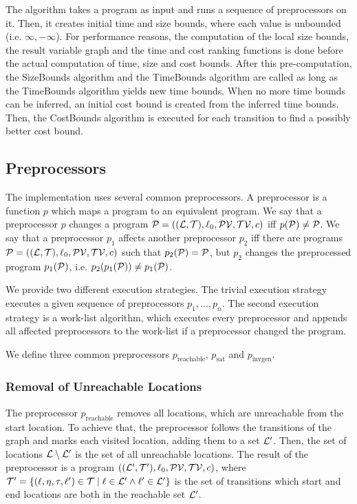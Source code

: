The algorithm takes a program as input and runs a sequence of preprocessors on it.
Then, it creates initial time and size bounds, where each value is unbounded (i.e. $\infty, -\infty$).
For performance reasons, the computation of the local size bounds, the result variable graph and the time and cost ranking functions is done before the actual computation of time, size and cost bounds.
After this pre-computation, the SizeBounds algorithm and the TimeBounds algorithm are called as long as the TimeBounds algorithm yields new time bounds.
When no more time bounds can be inferred, an initial cost bound is created from the inferred time bounds.
Then, the CostBounds algorithm is executed for each transition to find a possibly better cost bound.

\subsection{Preprocessors}

The implementation uses several common preprocessors.
A preprocessor is a function $p$ which maps a program to an equivalent program.
We say that a preprocessor $p$ changes a program $\mathcal{P} = ((\mathcal{L}, \mathcal{T}), \ell_0, \mathcal{PV}, \mathcal{TV}, c)$ iff $p(\mathcal{P}) \neq \mathcal{P}$.
We say that a preprocessor $p_1$ affects another preprocessor $p_2$ iff there are programs $\mathcal{P} = ((\mathcal{L}, \mathcal{T}), \ell_0, \mathcal{PV}, \mathcal{TV}, c)$ such that $p_2(\mathcal{P}) = \mathcal{P}$, but $p_2$ changes the preprocessed program $p_1(\mathcal{P})$, i.e. $p_2(p_1(\mathcal{P})) \neq p_1(\mathcal{P})$.

We provide two different execution strategies.
The trivial execution strategy executes a given sequence of preprocessors $p_1, \dots, p_n$.
The second execution strategy is a work-list algorithm, which executes every preprocessor and appends all affected preprocessors to the work-list if a preprocessor changed the program.

We define three common preprocessors $p_{\text{reachable}}$, $p_{\text{sat}}$ and $p_{\text{invgen}}$.

\subsubsection{Removal of Unreachable Locations}

The preprocessor $p_{\text{reachable}}$ removes all locations, which are unreachable from the start location.
To achieve that, the preprocessor follows the transitions of the graph and marks each visited location, adding them to a set $\mathcal{L}'$.
Then, the set of locations $\mathcal{L} \setminus \mathcal{L}'$ is the set of all unreachable locations.
The result of the preprocessor is a program $((\mathcal{L}', \mathcal{T}'), \ell_0, \mathcal{PV}, \mathcal{TV}, c)$, where $\mathcal{T}' = \lbrace (\ell,\eta,\tau,\ell') \in \mathcal{T} \mid \ell \in \mathcal{L}' \wedge \ell' \in \mathcal{L}' \rbrace$ is the set of transitions which start and end locations are both in the reachable set $\mathcal{L}'$.

